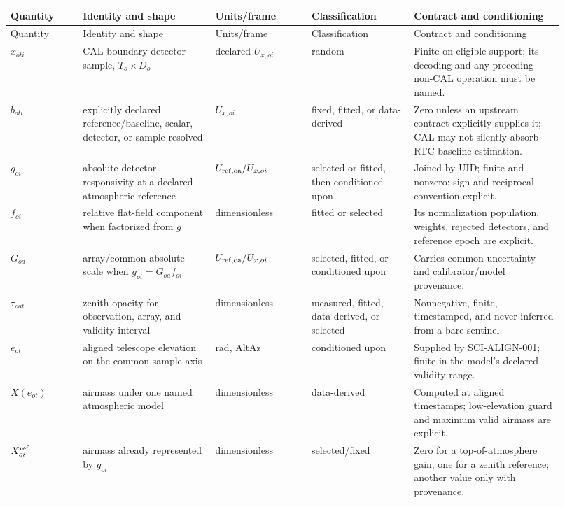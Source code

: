 \documentclass[11pt]{article}
\begin{document}
\begin{longtable}{L{0.12\linewidth}L{0.22\linewidth}L{0.16\linewidth}L{0.17\linewidth}L{0.25\linewidth}}
\toprule
Quantity & Identity and shape & Units/frame & Classification & Contract and conditioning\\
\midrule
\endfirsthead
\toprule
Quantity & Identity and shape & Units/frame & Classification & Contract and conditioning\\
\midrule
\endhead
\(x_{oti}\) & CAL-boundary detector sample, \(T_o\times D_o\) & declared \(U_{x,oi}\) & random & Finite on eligible support; its decoding and any preceding non-CAL operation must be named.\\
\(b_{oti}\) & explicitly declared reference/baseline, scalar, detector, or sample resolved & \(U_{x,oi}\) & fixed, fitted, or data-derived & Zero unless an upstream contract explicitly supplies it; CAL may not silently absorb RTC baseline estimation.\\
\(g_{oi}\) & absolute detector responsivity at a declared atmospheric reference & \(U_{\rm ref,oa}/U_{x,oi}\) & selected or fitted, then conditioned upon & Joined by UID; finite and nonzero; sign and reciprocal convention explicit.\\
\(f_{oi}\) & relative flat-field component when factorized from \(g\) & dimensionless & fitted or selected & Its normalization population, weights, rejected detectors, and reference epoch are explicit.\\
\(G_{oa}\) & array/common absolute scale when \(g_{oi}=G_{oa}f_{oi}\) & \(U_{\rm ref,oa}/U_{x,oi}\) & selected, fitted, or conditioned upon & Carries common uncertainty and calibrator/model provenance.\\
\(\tau_{oat}\) & zenith opacity for observation, array, and validity interval & dimensionless & measured, fitted, data-derived, or selected & Nonnegative, finite, timestamped, and never inferred from a bare sentinel.\\
\(e_{ot}\) & aligned telescope elevation on the common sample axis & rad, AltAz & conditioned upon & Supplied by SCI-ALIGN-001; finite in the model's declared validity range.\\
\(X(e_{ot})\) & airmass under one named atmospheric model & dimensionless & data-derived & Computed at aligned timestamps; low-elevation guard and maximum valid airmass are explicit.\\
\(X^{\rm ref}_{oi}\) & airmass already represented by \(g_{oi}\) & dimensionless & selected/fixed & Zero for a top-of-atmosphere gain; one for a zenith reference; another value only with provenance.\\

\end{longtable}
\end{document}
